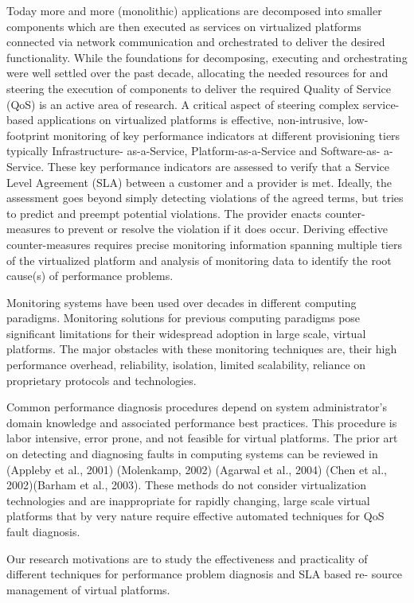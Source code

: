 Today more and more (monolithic) applications are decomposed into smaller components which are then executed as services on virtualized platforms connected via network communication and orchestrated to deliver the desired functionality. While the foundations for decomposing, executing and orchestrating were well settled over the past decade, allocating the needed resources for and steering the execution of components to deliver the required Quality of Service (QoS) is an active area of research. A critical aspect of steering complex service-based applications on virtualized platforms is effective, non-intrusive, low-footprint monitoring of key performance indicators at different provisioning tiers typically Infrastructure- as-a-Service, Platform-as-a-Service and Software-as- a-Service. These key performance indicators are assessed to verify that a Service Level Agreement (SLA) between a customer and a provider is met. Ideally, the assessment goes beyond simply detecting violations of the agreed terms, but tries to predict and preempt potential violations. The provider enacts counter-measures to prevent or resolve the violation if it does occur. Deriving effective counter-measures requires precise monitoring information spanning multiple tiers of the virtualized platform and analysis of monitoring data to identify the root cause(s) of performance problems.

Monitoring systems have been used over decades in different computing paradigms. Monitoring solutions for previous computing paradigms pose significant limitations for their widespread adoption in large scale, virtual platforms. The major obstacles with these monitoring techniques are, their high performance overhead, reliability, isolation, limited scalability, reliance on proprietary protocols and technologies.

Common performance diagnosis procedures depend on system administrator’s domain knowledge and associated performance best practices. This procedure is labor intensive, error prone, and not feasible for virtual platforms. The prior art on detecting and diagnosing faults in computing systems can be reviewed in (Appleby et al., 2001) (Molenkamp, 2002) (Agarwal et al., 2004) (Chen et al., 2002)(Barham et al., 2003). These methods do not consider virtualization technologies and are inappropriate for rapidly changing, large scale virtual platforms that by very nature require effective automated techniques for QoS fault diagnosis.

Our research motivations are to study the effectiveness and practicality of different techniques for performance problem diagnosis and SLA based re- source management of virtual platforms. 


